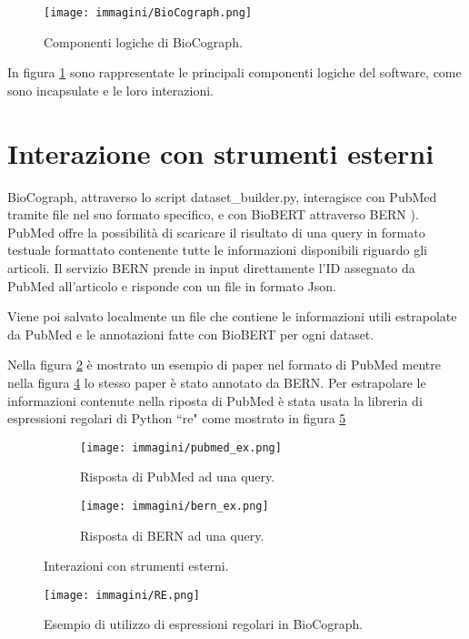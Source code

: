 \documentclass[12pt]{report}
\newcommand{\quotes}[1]{``#1"}
\begin{document}
\begin{figure}[!htb]
\centering
\texttt{[image: immagini/BioCograph.png]}
\caption{\footnotesize{Componenti logiche di BioCograph.}}
\label{fig:biocograph_logic}
\end{figure}

In figura \ref{fig:biocograph_logic} sono rappresentate le principali componenti logiche del software, come sono incapsulate e le loro interazioni.

\section{Interazione con strumenti esterni}
BioCograph, attraverso lo script dataset\_builder.py, interagisce con PubMed tramite file nel suo formato specifico, e con BioBERT attraverso BERN \cite{bernservice}). PubMed offre la possibilità di scaricare il risultato di una query in formato testuale formattato contenente tutte le informazioni disponibili riguardo gli articoli. Il servizio BERN prende in input direttamente l'ID assegnato da PubMed all'articolo e risponde con un file in formato Json.

Viene poi salvato localmente un file che contiene le informazioni utili estrapolate da PubMed e le annotazioni fatte con BioBERT per ogni dataset.

Nella figura \ref{fig:pubmed_ex} è mostrato un esempio di paper nel formato di PubMed mentre nella figura \ref{fig:bern_ex} lo stesso paper è stato annotato da BERN. Per estrapolare le informazioni contenute nella riposta di PubMed è stata usata la libreria di espressioni regolari di Python \quotes{re} come mostrato in figura \ref{fig:re}

\begin{figure}[!htb]
\centering
\begin{subfigure}{.5\textwidth}
    \centering
    \texttt{[image: immagini/pubmed\_ex.png]}
    \caption{\footnotesize{Risposta di PubMed ad una query.}}
    \label{fig:pubmed_ex}
\end{subfigure}%
\centering
\begin{subfigure}{.5\textwidth}
    \centering
    \texttt{[image: immagini/bern\_ex.png]}
    \caption{\footnotesize{Risposta di BERN ad una query.}}
    \label{fig:bern_ex}
\end{subfigure}
\caption{Interazioni con strumenti esterni.}
\end{figure}

\begin{figure}[!htb]
\centering
\texttt{[image: immagini/RE.png]}
\caption{\footnotesize{Esempio di utilizzo di espressioni regolari in BioCograph.}}
\label{fig:re}
\end{figure}
\end{document}
